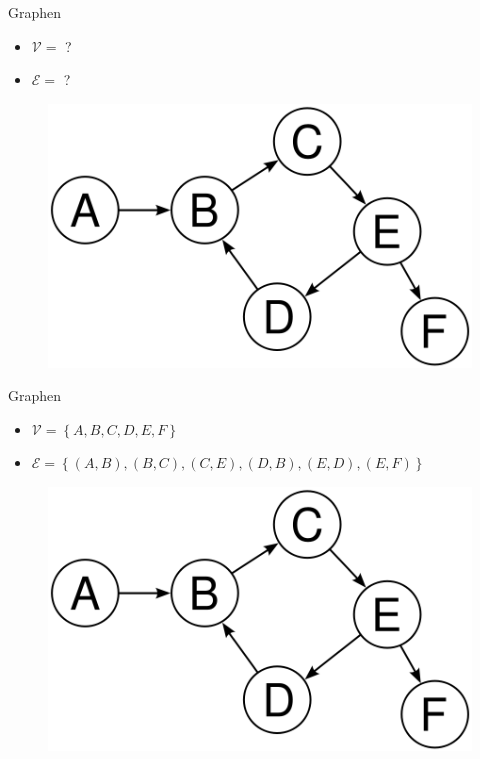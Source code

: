 \documentclass[18pt]{beamer}
\begin{document}
\begin{frame}{Graphen}

        \begin{exampleblock}{}
            \begin{itemize}
                \item $\mathcal{V} = $ ?
                \item $\mathcal{E} = $ ?
            \end{itemize}
        \end{exampleblock}


        \begin{figure}
            \includegraphics[scale=.3]{img/graph.png}
        \end{figure}

\end{frame}

\begin{frame}{Graphen}

        \begin{exampleblock}{}
            \begin{itemize}
                \item $\mathcal{V} = \left\{ A, B, C, D, E, F \right\}$
                \item $\mathcal{E} = \left\{ (A, B), (B, C), (C, E), (D, B), (E, D), (E, F) \right\}$
            \end{itemize}
        \end{exampleblock}


        \begin{figure}
            \includegraphics[scale=.3]{img/graph.png}
        \end{figure}

\end{frame}
\end{document}
